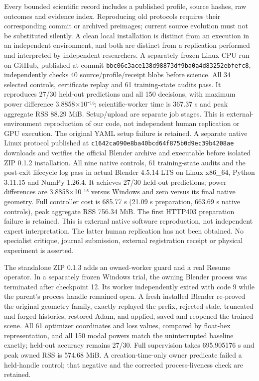 \documentclass[
  10pt,
]{article}
\begin{document}
Every bounded scientific record includes a published profile, source
hashes, raw outcomes and evidence index. Reproducing old protocols
requires their corresponding commit or archived preimages; current
source evolution must not be substituted silently. A clean local
installation is distinct from an execution in an independent
environment, and both are distinct from a replication performed and
interpreted by independent researchers. A separately frozen Linux CPU
run on GitHub, published at commit
\texttt{bbc06c3ace138d98873df9ba0a4d83252ebfefc8}, independently checks
40 source/profile/receipt blobs before science. All 34 selected
controls, certificate replay and 61 training-state audits pass. It
reproduces 27/30 held-out predictions and all 150 decisions, with
maximum power difference 3.8858×10⁻¹⁶; scientific-worker time is 367.37
s and peak aggregate RSS 88.29 MiB. Setup/upload are separate job
stages. This is external-environment reproduction of our code, not
independent human replication or GPU execution. The original YAML setup
failure is retained. A separate native Linux protocol published at
\texttt{c1642ca090e8ba40bcd64f875b0d9ec39b4208ae} downloads and verifies
the official Blender archive and executable before isolated ZIP 0.1.2
installation. All nine native controls, 61 training-state audits and the
post-exit lifecycle log pass in actual Blender 4.5.14 LTS on Linux
x86\_64, Python 3.11.15 and NumPy 1.26.4. It achieves 27/30 held-out
predictions; power differences are 3.8858×10⁻¹⁶ versus Windows and zero
versus its final native geometry. Full controller cost is 685.77 s
(21.09 s preparation, 663.69 s native controls), peak aggregate RSS
756.34 MiB. The first HTTP403 preparation failure is retained. This is
external native software reproduction, not independent expert
interpretation. The latter human replication has not been obtained. No
specialist critique, journal submission, external registration receipt
or physical experiment is asserted.

The standalone ZIP 0.1.3 adds an owned-worker guard and a real Resume
operator. In a separately frozen Windows trial, the owning Blender
process was terminated after checkpoint 12. Its worker independently
exited with code 9 while the parent's process handle remained open. A
fresh installed Blender re-proved the original geometry family, exactly
replayed the prefix, rejected stale, truncated and forged histories,
restored Adam, and applied, saved and reopened the trained scene. All 61
optimizer coordinates and loss values, compared by float-hex
representation, and all 150 modal powers match the uninterrupted
baseline exactly; held-out accuracy remains 27/30. Full supervision
takes 695.905176 s and peak owned RSS is 574.68 MiB. A
creation-time-only owner predicate failed a held-handle control; that
negative and the corrected process-liveness check are retained.
\end{document}
